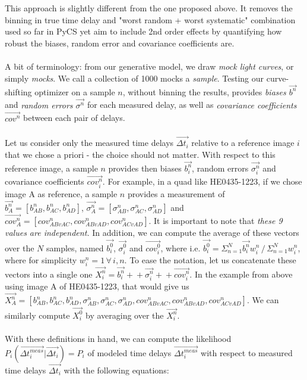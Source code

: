 \documentclass[11pt]{scrartcl}
\renewcommand{\vec}{\overrightarrow}  %
\begin{document}
This approach is slightly different from the one proposed above. It 
removes the binning in true time delay and "worst random + worst 
systematic" combination used so far in PyCS yet aim to include 2nd order 
effects by quantifying how robust the biases, random error and 
covariance coefficients are.\\
\\
A bit of terminology: from our generative model, we draw \emph{mock 
light curves}, or simply \emph{mocks}. We call a collection of 1000 
mocks a \emph{sample}. Testing our curve-shifting optimizer on a 
sample $n$, without binning the results, provides \emph{biases 
$\vec{b^n}$} and \emph{random errors $\vec{\sigma^n}$} for each 
measured delay, as well as \emph{covariance coefficients $\vec{cov^n}$} 
between each pair of delays.\\
\\
Let us consider only the measured time delays $\vec{\Delta t_{i}}$ 
relative to a reference image $i$ that we chose a priori - the choice 
should not matter. With respect to this reference image, a sample $n$ 
provides then biases $\vec{b^n_i}$, random errors $\vec{\sigma^n_i}$ 
and covariance coefficients $\vec{cov^n_i}$. For example, in a quad 
like HE0435-1223, if we chose image A as reference, a sample $n$ 
provides a measurement of $\vec{b^n_A} = [b^n_{AB}, b^n_{AC}, 
b^n_{AD}]$, 
$\vec{\sigma^n_A} = [\sigma^n_{AB}, \sigma^n_{AC}, \sigma^n_{AD}]$ and 
$\vec{cov^n_A} = [cov^n_{ABvAC}, cov^n_{ABvAD}, cov^n_{ACvAD}]$. It is 
important to note that \emph{these 9 values are independent.} In 
addition, we can compute the average of these vectors over the $N$ 
samples, named $\vec{b^0_i}$, $\vec{\sigma^0_i}$ and $\vec{cov^0_i}$, 
where i.e. $\vec{b^0_i} = \Sigma_{n=1}^N \vec{b^n_i}w_i^n \, / \, 
\Sigma_{n=1}^Nw_i^n$, where for simplicity $w_i^n=1 \,\forall\, i,n$. 
To ease the notation, let us concatenate these vectors into a single 
one $\vec{X^n_i} = 
\vec{b^n_i}+\!\!+\vec{\sigma^n_i}+\!\!+\vec{cov^n_i}$. In the example 
from above using image A of HE0435-1223, that would give us 
$\vec{X^n_A} = [b^n_{AB}, b^n_{AC}, b^n_{AD}, \sigma^n_{AB}, 
\sigma^n_{AC}, \sigma^n_{AD}, cov^n_{ABvAC}, cov^n_{ABvAD}, 
cov^n_{ACvAD}]$. We can similarly compute $\vec{X^0_i}$ by averaging 
over the $\vec{X^n_i}$.\\
\\
With these definitions in hand, we can compute the likelihood 
$P_i(\vec{\Delta t_{i}^{meas}}|\vec{\Delta t_{i}}) = P_i$ of modeled 
time delays $\vec{\Delta t_{i}^{meas}}$ with respect to measured time 
delays $\vec{\Delta t_{i}}$ with the following equations:
\end{document}
